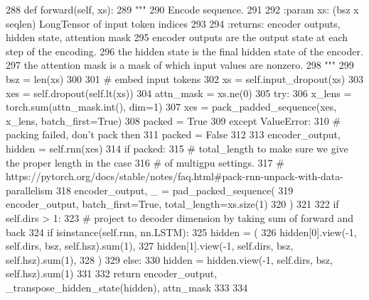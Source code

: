 \begin{DoxyCode}
288     \textcolor{keyword}{def }forward(self, xs):
289         \textcolor{stringliteral}{"""}
290 \textcolor{stringliteral}{        Encode sequence.}
291 \textcolor{stringliteral}{}
292 \textcolor{stringliteral}{        :param xs: (bsz x seqlen) LongTensor of input token indices}
293 \textcolor{stringliteral}{}
294 \textcolor{stringliteral}{        :returns: encoder outputs, hidden state, attention mask}
295 \textcolor{stringliteral}{            encoder outputs are the output state at each step of the encoding.}
296 \textcolor{stringliteral}{            the hidden state is the final hidden state of the encoder.}
297 \textcolor{stringliteral}{            the attention mask is a mask of which input values are nonzero.}
298 \textcolor{stringliteral}{        """}
299         bsz = len(xs)
300 
301         \textcolor{comment}{# embed input tokens}
302         xs = self.input\_dropout(xs)
303         xes = self.dropout(self.lt(xs))
304         attn\_mask = xs.ne(0)
305         \textcolor{keywordflow}{try}:
306             x\_lens = torch.sum(attn\_mask.int(), dim=1)
307             xes = pack\_padded\_sequence(xes, x\_lens, batch\_first=\textcolor{keyword}{True})
308             packed = \textcolor{keyword}{True}
309         \textcolor{keywordflow}{except} ValueError:
310             \textcolor{comment}{# packing failed, don't pack then}
311             packed = \textcolor{keyword}{False}
312 
313         encoder\_output, hidden = self.rnn(xes)
314         \textcolor{keywordflow}{if} packed:
315             \textcolor{comment}{# total\_length to make sure we give the proper length in the case}
316             \textcolor{comment}{# of multigpu settings.}
317             \textcolor{comment}{# https://pytorch.org/docs/stable/notes/faq.html#pack-rnn-unpack-with-data-parallelism}
318             encoder\_output, \_ = pad\_packed\_sequence(
319                 encoder\_output, batch\_first=\textcolor{keyword}{True}, total\_length=xs.size(1)
320             )
321 
322         \textcolor{keywordflow}{if} self.dirs > 1:
323             \textcolor{comment}{# project to decoder dimension by taking sum of forward and back}
324             \textcolor{keywordflow}{if} isinstance(self.rnn, nn.LSTM):
325                 hidden = (
326                     hidden[0].view(-1, self.dirs, bsz, self.hsz).sum(1),
327                     hidden[1].view(-1, self.dirs, bsz, self.hsz).sum(1),
328                 )
329             \textcolor{keywordflow}{else}:
330                 hidden = hidden.view(-1, self.dirs, bsz, self.hsz).sum(1)
331 
332         \textcolor{keywordflow}{return} encoder\_output, \_transpose\_hidden\_state(hidden), attn\_mask
333 
334 
\end{DoxyCode}


